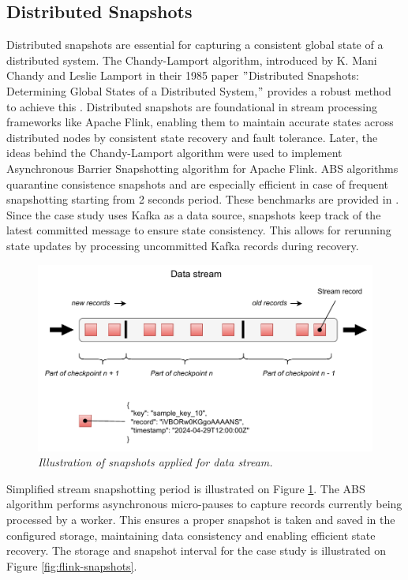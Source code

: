 \subsection{Distributed Snapshots}\label{subsec:distributed-snapshots}
Distributed snapshots are essential for capturing a consistent global state of a distributed system.
The Chandy-Lamport algorithm, introduced by K. Mani Chandy and Leslie Lamport in their 1985 paper
\("\)Distributed Snapshots: Determining Global States of a Distributed System,\("\) provides a robust method to achieve
this \cite{chandy1985distributed}.
Distributed snapshots are foundational in stream processing frameworks like Apache Flink,
enabling them to maintain accurate states across distributed
nodes by consistent state recovery and fault tolerance.
Later, the ideas behind the Chandy-Lamport algorithm were used to implement Asynchronous Barrier Snapshotting \cite{flinkCheckpoints}
algorithm for Apache Flink.
ABS algorithms quarantine consistence snapshots and are especially efficient in case of
frequent snapshotting starting from 2 seconds period.
These benchmarks are provided in \cite{flinkCheckpoints}.
Since the case study uses Kafka as a data source, snapshots keep track of the latest committed message to ensure state consistency.
This allows for rerunning state updates by processing uncommitted Kafka records during recovery.


\begin{figure}[H]
    \centering
    \includegraphics[width=1\textwidth]{figures/data-stream}
    \caption{\textit{Illustration of snapshots applied for data stream.}}
    \label{fig:flink-stream-snapshots}
\end{figure}


Simplified stream snapshotting period is illustrated on Figure \ref{fig:flink-stream-snapshots}.
The ABS algorithm performs asynchronous micro-pauses to capture
records currently being processed by a worker.
This ensures a proper snapshot is taken and saved in the configured storage,
maintaining data consistency and enabling efficient state recovery.
The storage and snapshot interval for the case study is illustrated on Figure \ref{fig:flink-snapshots}.


